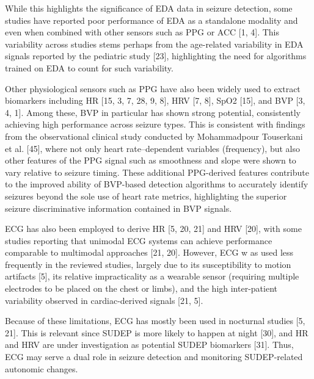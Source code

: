 While this highlights the significance of EDA data in seizure detection, some studies have reported poor performance of EDA as a standalone modality and even when combined with other sensors such as PPG or ACC [1, 4]. This variability across studies stems perhaps from the age-related variability in EDA signals reported by the pediatric study [23], highlighting the need for algorithms trained on EDA to count for such variability. 

Other physiological sensors such as PPG have also been widely used to extract biomarkers including HR [15, 3, 7, 28, 9, 8], HRV [7, 8], SpO2 [15], and BVP [3, 4, 1]. Among these, BVP in particular has shown strong potential, consistently achieving high performance across seizure types. This is consistent with findings from the observational clinical study conducted by Mohammadpour Touserkani et al. [45], where not only heart rate–dependent variables (frequency), but also other features of the PPG signal such as smoothness and slope were shown to vary relative to seizure timing. These additional PPG-derived features contribute to the improved ability of BVP-based detection algorithms to accurately identify seizures beyond the sole use of heart rate metrics, highlighting the superior seizure discriminative information contained in BVP signals.

ECG has also been employed to derive HR [5, 20, 21] and HRV [20], with some studies reporting that unimodal ECG systems can achieve performance comparable to multimodal approaches [21, 20]. However, ECG w as used less frequently in the reviewed studies, largely due to its susceptibility to motion artifacts [5], its relative impracticality as a wearable sensor (requiring multiple electrodes to be placed on the chest or limbs), and the high inter-patient variability observed in cardiac-derived signals [21, 5].

Because of these limitations, ECG has mostly been used in nocturnal studies [5, 21]. This is relevant since SUDEP is more likely to happen at night [30], and HR and HRV are under investigation as potential SUDEP   biomarkers [31]. Thus, ECG may serve a dual role in seizure detection and monitoring SUDEP-related autonomic changes.

